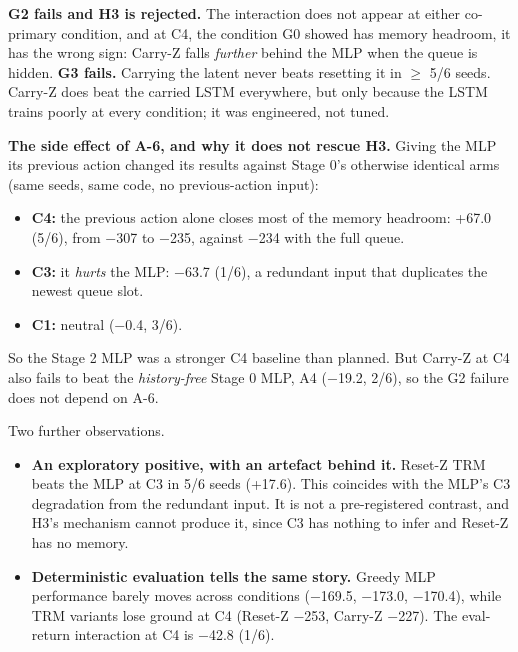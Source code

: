 \documentclass[11pt]{article}
\begin{document}
\textbf{G2 fails and H3 is rejected.} The interaction does not appear at either co-primary condition, and at C4, the condition G0 showed has memory headroom, it has the wrong sign: Carry-Z falls \emph{further} behind the MLP when the queue is hidden. \textbf{G3 fails.} Carrying the latent never beats resetting it in $\geq$ 5/6 seeds. Carry-Z does beat the carried LSTM everywhere, but only because the LSTM trains poorly at every condition; it was engineered, not tuned.



\textbf{The side effect of A-6, and why it does not rescue H3.} Giving the MLP its previous action changed its results against Stage 0's otherwise identical arms (same seeds, same code, no previous-action input):

\begin{itemize}
\item \textbf{C4:} the previous action alone closes most of the memory headroom: +67.0 (5/6), from $-$307 to $-$235, against $-$234 with the full queue.
\item \textbf{C3:} it \emph{hurts} the MLP: $-$63.7 (1/6), a redundant input that duplicates the newest queue slot.
\item \textbf{C1:} neutral ($-$0.4, 3/6).
\end{itemize}



So the Stage 2 MLP was a stronger C4 baseline than planned. But Carry-Z at C4 also fails to beat the \emph{history-free} Stage 0 MLP, A4 ($-$19.2, 2/6), so the G2 failure does not depend on A-6.



Two further observations.

\begin{itemize}
\item \textbf{An exploratory positive, with an artefact behind it.} Reset-Z TRM beats the MLP at C3 in 5/6 seeds (+17.6). This coincides with the MLP's C3 degradation from the redundant input. It is not a pre-registered contrast, and H3's mechanism cannot produce it, since C3 has nothing to infer and Reset-Z has no memory.
\item \textbf{Deterministic evaluation tells the same story.} Greedy MLP performance barely moves across conditions ($-$169.5, $-$173.0, $-$170.4), while TRM variants lose ground at C4 (Reset-Z $-$253, Carry-Z $-$227). The eval-return interaction at C4 is $-$42.8 (1/6).
\end{itemize}
\end{document}

